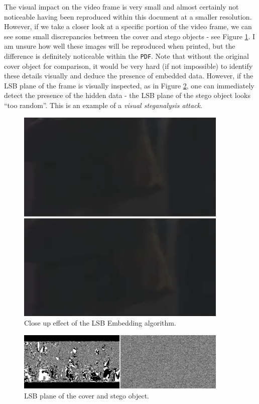 \documentclass[paper=a4, fontsize=11pt,twoside]{scrartcl}
\numberwithin{table}{section}
\numberwithin{figure}{section}
\numberwithin{algorithm}{section}
\begin{document}
\noindent
The visual impact on the video frame is very small and almost certainly not noticeable having been reproduced within this document at a smaller resolution. However, if we take a closer look at a specific portion of the video frame, we can see some small discrepancies between the cover and stego objects - see Figure \ref{lsbcloseup}. I am unsure how well these images will be reproduced when printed, but the difference is definitely noticeable within the \texttt{PDF}. Note that without the original cover object for comparison, it would be very hard (if not impossible) to identify these details visually and deduce the presence of embedded data. However, if the LSB plane of the frame is visually inspected, as in Figure \ref{lsbemb}, one can immediately detect the presence of the hidden data - the LSB plane of the stego object looks ``too random''. This is an example of a \textit{visual steganalysis attack}.


\begin{figure}
\centerline{\includegraphics[width=0.9\textwidth]{images/closeup_3.png}}
\caption{Close up effect of the LSB Embedding algorithm.}
\label{lsbcloseup}
\end{figure}


\begin{figure}
\centerline{\includegraphics[width=0.9\textwidth]{images/lsb_emb.png}}
\caption{LSB plane of the cover and stego object.}
\label{lsbemb}
\end{figure}
\end{document}
